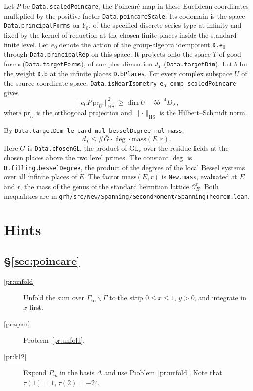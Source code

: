 \documentclass[reqno]{amsart}
\theoremstyle{definition}
\theoremstyle{plain}
\begin{document}
Let \(P\) be \texttt{Data.scaledPoincare}, the Poincar\'e map in these Euclidean coordinates multiplied by the positive factor \texttt{Data.poincareScale}.  Its codomain is the space \texttt{Data.principalForms} on \(Y_0\), of the specified discrete-series type at infinity and fixed by the kernel of reduction at the chosen finite places inside the standard finite level.  Let \(e_0\) denote the action of the group-algebra idempotent \texttt{D.e\(_0\)} through \texttt{Data.principalRep} on this space.  It projects onto the space \(T\) of good forms (\texttt{Data.targetForms}), of complex dimension \(d_T\) (\texttt{Data.targetDim}).  Let \(b\) be the weight \texttt{D.b} at the infinite places \texttt{D.bPlaces}.  For every complex subspace \(U\) of the source coordinate space, \texttt{Data.isNearIsometry\_e\(_0\)\_comp\_scaledPoincare} gives
\[
  \lVert e_0 P\,\mathrm{pr}_U\rVert_{\mathrm{HS}}^2
  \ge \dim U - 5b^{-4}D_X ,
\]
where \(\mathrm{pr}_U\) is the orthogonal projection and \(\lVert\cdot\rVert_{\mathrm{HS}}\) is the Hilbert--Schmidt norm.

By \texttt{Data.targetDim\_le\_card\_mul\_besselDegree\_mul\_mass},
\[
  d_T \le \#\bar G \cdot \deg \cdot \mathrm{mass}(E,r) .
\]
Here \(\bar G\) is \texttt{Data.chosenGL}, the product of \(\mathrm{GL}_r\) over the residue fields at the chosen places above the two level primes.  The constant \(\deg\) is \texttt{D.filling.besselDegree}, the product of the degrees of the local Bessel systems over all infinite places of \(E\).  The factor \(\mathrm{mass}(E,r)\) is \texttt{New.mass}, evaluated at \(E\) and \(r\), the mass of the genus of the standard hermitian lattice \(\mathcal O_E^r\).  Both inequalities are in \texttt{grh/src/New/Spanning/SecondMoment/SpanningTheorem.lean}.

\section*{Hints}

\subsection*{\S\ref{sec:poincare}}
\begin{description}
\item[\ref{pr:unfold}] Unfold the sum over \(\Gamma_\infty\backslash\Gamma\) to the strip \(0 \le x \le 1\), \(y > 0\), and integrate in \(x\) first.
\item[\ref{pr:span}] Problem~\ref{pr:unfold}.
\item[\ref{pr:k12}] Expand \(P_m\) in the basis \(\Delta\) and use Problem~\ref{pr:unfold}.  Note that \(\tau(1) = 1\), \(\tau(2) = -24\).
\end{description}
\end{document}
